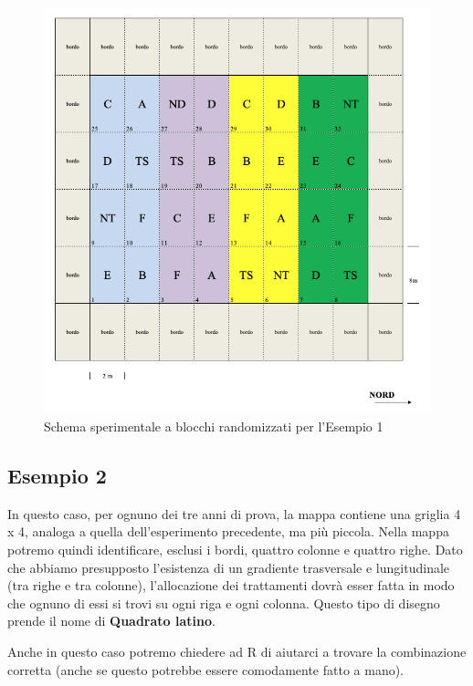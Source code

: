 \documentclass[a4paper,12pt,oneside]{book}
\theoremstyle{definition}
\theoremstyle{definition}
\theoremstyle{definition}
\theoremstyle{remark}
\begin{document}
\begin{figure}

{\centering \includegraphics[width=0.9\linewidth]{_images/Mappa1CRBD} 

}

\caption{Schema sperimentale a blocchi randomizzati per l'Esempio 1}\label{fig:figName34}
\end{figure}

\subsection{Esempio 2}\label{esempio-2-1}

In questo caso, per ognuno dei tre anni di prova, la mappa contiene una
griglia 4 x 4, analoga a quella dell'esperimento precedente, ma più
piccola. Nella mappa potremo quindi identificare, esclusi i bordi,
quattro colonne e quattro righe. Dato che abbiamo presupposto
l'esistenza di un gradiente trasversale e lungitudinale (tra righe e tra
colonne), l'allocazione dei trattamenti dovrà esser fatta in modo che
ognuno di essi si trovi su ogni riga e ogni colonna. Questo tipo di
disegno prende il nome di \textbf{Quadrato latino}.

Anche in questo caso potremo chiedere ad R di aiutarci a trovare la
combinazione corretta (anche se questo potrebbe essere comodamente fatto
a mano).
\end{document}
